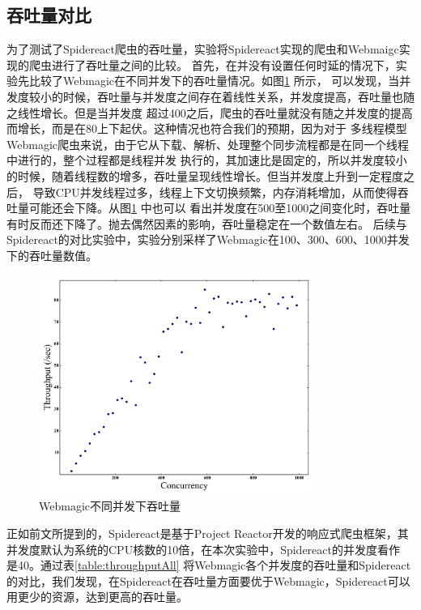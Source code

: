 \documentclass[master]{njuthesis}
\begin{document}
\subsection{吞吐量对比}
为了测试了Spidereact爬虫的吞吐量，实验将Spidereact实现的爬虫和Webmaigc实现的爬虫进行了吞吐量之间的比较。
首先，在并没有设置任何时延的情况下，实验先比较了Webmagic在不同并发下的吞吐量情况。如图\ref{webmagic-con} 所示，
可以发现，当并发度较小的时候，吞吐量与并发度之间存在着线性关系，并发度提高，吞吐量也随之线性增长。但是当并发度
超过400之后，爬虫的吞吐量就没有随之并发度的提高而增长，而是在80上下起伏。这种情况也符合我们的预期，因为对于
多线程模型Webmagic爬虫来说，由于它从下载、解析、处理整个同步流程都是在同一个线程中进行的，整个过程都是线程并发
执行的，其加速比是固定的，所以并发度较小的时候，随着线程数的增多，吞吐量呈现线性增长。但当并发度上升到一定程度之后，
导致CPU并发线程过多，线程上下文切换频繁，内存消耗增加，从而使得吞吐量可能还会下降。从图\ref{webmagic-con} 中也可以
看出并发度在500至1000之间变化时，吞吐量有时反而还下降了。抛去偶然因素的影响，吞吐量稳定在一个数值左右。
后续与Spidereact的对比实验中，实验分别采样了Webmagic在100、300、600、1000并发下的吞吐量数值。

\begin{figure}
\centering
\includegraphics[width=0.8\textwidth]{pic/concurrent.png}

\caption{Webmagic不同并发下吞吐量}\label{webmagic-con}
\end{figure}


正如前文所提到的，Spidereact是基于Project Reactor开发的响应式爬虫框架，其并发度默认为系统的CPU核数的10倍，在本次实验中，Spidereact的并发度看作
是40。通过表\ref{table:throughputAll} 将Webmagic各个并发度的吞吐量和Spidereact的对比，我们发现，在Spidereact在吞吐量方面要优于Webmagic，Spidereact可以
用更少的资源，达到更高的吞吐量。
\end{document}

